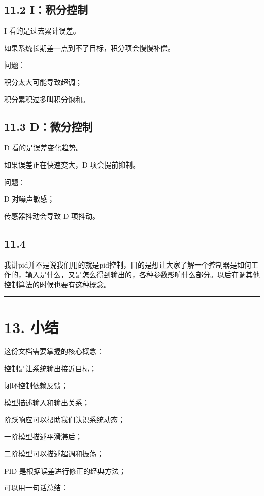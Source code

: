 \documentclass[a4paper,12pt]{book}
\begin{document}
{\subsection{11.2 I：积分控制}

I 看的是过去累计误差。

如果系统长期差一点到不了目标，积分项会慢慢补偿。

问题：

\item 积分太大可能导致超调；
\item 积分累积过多叫积分饱和。

\subsection{11.3 D：微分控制}

D 看的是误差变化趋势。

如果误差正在快速变大，D 项会提前抑制。

问题：

\item D 对噪声敏感；
\item 传感器抖动会导致 D 项抖动。


\subsection{11.4}

我讲pid并不是说我们用的就是pid控制，目的是想让大家了解一个控制器是如何工作的，输入是什么，又是怎么得到输出的，各种参数影响什么部分。以后在调其他控制算法的时候也要有这种概念。

\noindent\rule{\textwidth}{1pt}

\section{13. 小结}

这份文档需要掌握的核心概念：

\item 控制是让系统输出接近目标；
\item 闭环控制依赖反馈；
\item 模型描述输入和输出关系；
\item 阶跃响应可以帮助我们认识系统动态；
\item 一阶模型描述平滑滞后；
\item 二阶模型可以描述超调和振荡；
\item PID 是根据误差进行修正的经典方法；


可以用一句话总结：

}
\end{document}
